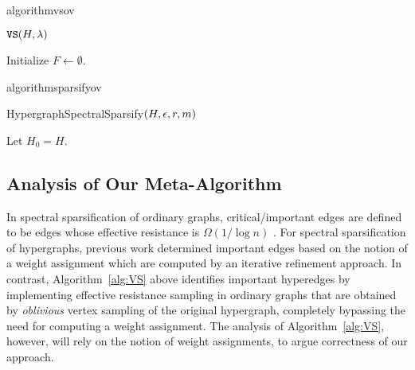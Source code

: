 \documentclass{article}
\begin{document}
\quad

\begin{restatable}[H]{algorithm}{vsov}
    \caption{$\mathtt{VS}(H,\lambda)$}
    \label{alg:VS}
    Initialize $F\gets \emptyset$. \\
\end{restatable}


\quad

\begin{restatable}[H]{algorithm}{sparsifyov}
    \caption{HypergraphSpectralSparsify$(H, \epsilon, r, m)$} \label{alg:sparsifyov}\label{alg:sparsifyintro}
    \label{alg:sparsify}
    Let $H_0 = H$. \\
\end{restatable}

\subsection{Analysis of Our Meta-Algorithm}

In spectral sparsification of ordinary graphs, critical/important edges are defined to be edges whose effective resistance is $\Omega(1/\log n)$ \cite{SS11}. For spectral sparsification of hypergraphs, previous work \cite{KKTY21b,JambulapatiLS23,Lee23} determined important edges based on the notion
of a weight assignment which are computed by an iterative refinement approach. In contrast, Algorithm~\ref{alg:VS}
above identifies important hyperedges by implementing effective resistance sampling in ordinary graphs that are obtained by \textit{oblivious} vertex sampling of the original hypergraph,
completely bypassing the need for computing a weight assignment. The analysis of Algorithm~\ref{alg:VS}, however, will rely on the notion of weight assignments, to argue correctness of our approach.
\end{document}
